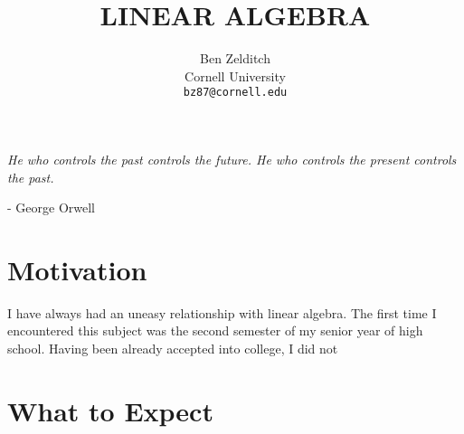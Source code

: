 \documentclass[paper=a4, fontsize=11pt,twoside]{scrartcl}   %
\title{  
            \LARGE \textbf{\uppercase{Linear Algebra}}    %
}
\author{
        Ben Zelditch\\   
        Cornell University\\  
        \texttt{bz87@cornell.edu} \\
}
\makeatletter
\def\printtitle{%
    {\centering \@title\par}}
\def\printauthor{%
    {\centering \large \@author}}
\makeatother
\begin{document}
\thispagestyle{empty}       %

\printtitle                 %
    \vfill
\printauthor                %
\newpage

 \textit{He who controls the past controls the future. He who controls the present controls the past.} 
 
 \vskip 1mm
		- George Orwell
\section{Motivation}

I have always had an uneasy relationship with linear algebra. The first time I encountered this subject was
the second semester of my senior year of high school. Having been already accepted into college, I did not 

\section{What to Expect}
\end{document}
